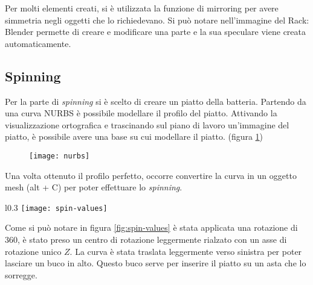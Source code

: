 \begin{figure}[hbt]
    \centering
	\vspace{-0.2cm}
\end{figure}

Per molti elementi creati, si è utilizzata la funzione di mirroring per avere simmetria negli oggetti che lo richiedevano. Si può notare nell'immagine del Rack: Blender permette di creare e modificare una parte e la sua speculare viene creata automaticamente.


\newpage

\subsection{Spinning}
Per la parte di \textit{spinning} si è scelto di creare un piatto della batteria. Partendo da una curva NURBS è possibile modellare il profilo del piatto. Attivando la visualizzazione ortografica e trascinando sul piano di lavoro un'immagine del piatto, è possibile avere una base su cui modellare il piatto. (figura \ref{fig:nurbs})

 \begin{figure}[htb]
    \centering
    \texttt{[image: nurbs]}
    \caption{\label{fig:nurbs}}
\end{figure}

Una volta ottenuto il profilo perfetto, occorre convertire la curva in un oggetto mesh (alt + C) per poter effettuare lo \textit{spinning}. 

\begin{wrapfigure}{l}{0.3\textwidth} %
    \centering
    \vspace{-0.7cm}
    \texttt{[image: spin-values]}
    \caption{\label{fig:spin-values}}
    \vspace{-3.7cm}
\end{wrapfigure}

\vspace{1cm}\noindent Come si può notare in figura \ref{fig:spin-values} è stata applicata una rotazione di 360\degree, è stato preso un centro di rotazione leggermente rialzato con un asse di rotazione unico $Z$.
La curva è stata traslata leggermente verso sinistra per poter lasciare un buco in alto. Questo buco serve per inserire il piatto su un asta che lo sorregge.\\

